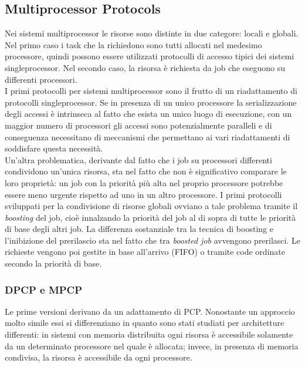 \subsection{Multiprocessor Protocols}
\label{sec:lockProtocols.multi}

Nei sistemi multiprocessor le risorse sono distinte in due categore: locali e globali. Nel primo caso i task che la richiedono sono tutti allocati nel medesimo processore, quindi possono essere utilizzati protocolli di accesso tipici dei sistemi singleprocessor. Nel secondo caso, la risorsa è richiesta da job che eseguono su differenti processori.\\
I primi protocolli per sistemi multiprocessor sono il frutto di un riadattamento di protocolli singleprocessor. Se in presenza di un unico processore la serializzazione degli accessi è intrinseca al fatto che esista un unico luogo di esecuzione, con un maggior numero di processori gli accessi sono potenzialmente paralleli e di conseguenza necessitano di meccanismi che permettano ai vari riadattamenti di soddisfare questa necessità.\\

Un'altra problematica, derivante dal fatto che i job su processori differenti condividono un'unica risorsa, sta nel fatto che non è significativo comparare le loro proprietà: un job con la priorità più alta nel proprio processore potrebbe essere meno urgente rispetto ad uno in un altro processore. I primi protocolli sviluppati per la condivisione di risorse globali ovviano a tale problema tramite il \textit{boosting} del job, cioè innalzando la priorità del job al di sopra di tutte le priorità di base degli altri job. La differenza sostanziale tra la tecnica di boosting e l'inibizione del prerilascio sta nel fatto che tra \textit{boosted job} avvengono prerilasci. Le richieste vengono poi gestite in base all'arrivo (FIFO) o tramite code ordinate secondo la priorità di base.

\subsubsection{DPCP e MPCP}
\label{sec:lockProtocols.dpcp.mpcp}

Le prime versioni derivano da un adattamento di PCP. Nonostante un approccio molto simile essi si differenziano in quanto sono stati studiati per architetture differenti: in sistemi con memoria distribuita ogni risorsa è accessibile solamente da un determinato processore nel quale è allocata; invece, in presenza di memoria condivisa, la risorsa è accessibile da ogni processore.\\

